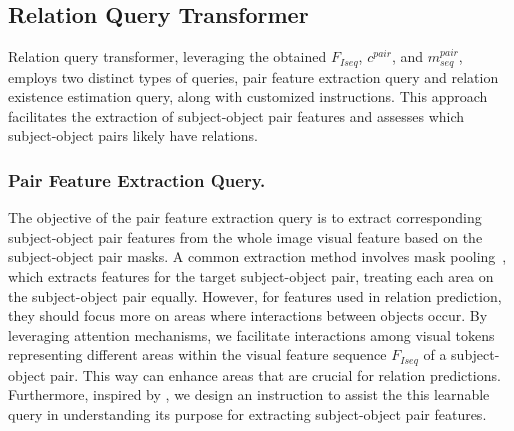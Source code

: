 \subsection{Relation Query Transformer}
\label{openpsg:sec:rel_q_former}
Relation query transformer, leveraging the obtained $F_{Iseq}$, $c^{pair}$, and $m_{seq}^{pair}$, employs two distinct types of queries, pair feature extraction query and relation existence estimation query, along with customized instructions.
This approach facilitates the extraction of subject-object pair features and assesses which subject-object pairs likely have relations.

\subsubsection{Pair Feature Extraction Query.}
The objective of the pair feature extraction query is to extract corresponding subject-object pair features from the whole image visual feature based on the subject-object pair masks.
A common extraction method involves mask pooling~\citep{dai2015convolutional}, which extracts features for the target subject-object pair, treating each area on the subject-object pair equally.
However, for features used in relation prediction, they should focus more on areas where interactions between objects occur. 
By leveraging attention mechanisms, we facilitate interactions among visual tokens representing different areas within the visual feature sequence $F_{Iseq}$ of a subject-object pair.
This way can enhance areas that are crucial for relation predictions.
Furthermore, inspired by \citep{liu2023improved}, we design an instruction to assist the this learnable query in understanding its purpose for extracting subject-object pair features. 


